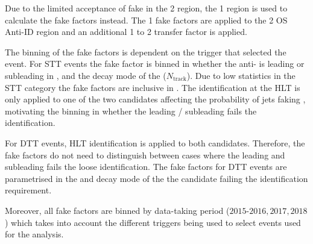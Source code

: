 Due to the limited acceptance of fake \tauhadvis in the 2 \btag region, the 1
\btag region is used to calculate the fake factors instead. The 1 \btag fake
factors are applied to the 2 \btag OS Anti-ID region and an additional 1 to 2
\btag transfer factor is applied.

The binning of the fake factors is dependent on the trigger that selected the
event. For STT events the fake factor is binned in whether the anti-\tauhadvis
is leading or subleading in \pT, and the decay mode of the \tauhadvis
($N_\text{track}$). Due to low statistics in the STT category the fake factors
are inclusive in \tauhadvis \pT. The \tauhadvis identification at the HLT is
only applied to one of the two \tauhadvis candidates affecting the probability
of jets faking \tauhadvis, motivating the binning in whether the leading /
subleading \tauhadvis fails the identification.

For DTT events, HLT \tauhadvis identification is applied to both \tauhadvis
candidates. Therefore, the fake factors do not need to distinguish between cases
where the leading and subleading \tauhadvis fails the loose identification. The
fake factors for DTT events are parametrised in the \pT and decay mode of the
the \tauhadvis candidate failing the identification requirement.

Moreover, all fake factors are binned by data-taking period (${\text{2015-2016},
  \text{2017}, \text{2018}}$) which takes into account the different triggers
being used to select events used for the analysis.




